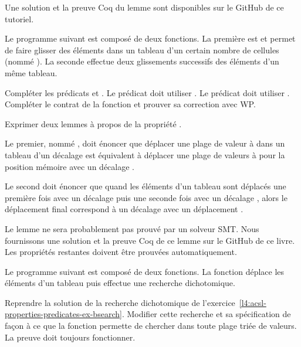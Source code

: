 Une solution et la preuve Coq du lemme sont disponibles sur le GitHub de ce tutoriel.


\label{l4:acsl-properties-lemmas-shift-trans}


Le programme suivant est composé de deux fonctions. La première est
 et permet de faire glisser des éléments dans un tableau
d'un certain nombre de cellules (nommé ). La seconde effectue deux
glissements successifs des éléments d'un même tableau.





Compléter les prédicats  et .
Le prédicat  doit utiliser .
Le prédicat  doit utiliser .
Compléter le contrat de la fonction  et prouver
sa correction avec WP.


Exprimer deux lemmes à propos de la propriété .


Le premier, nommé , doit énoncer que déplacer une plage de
valeur  à  dans un tableau 
d'un décalage  est équivalent à déplacer une plage de valeurs
 à  pour la position mémoire 
avec un décalage .


Le second doit énoncer que quand les éléments d'un tableau sont déplacés une première
fois avec un décalage  puis une seconde fois avec un décalage
, alors le déplacement final correspond à un décalage avec un
déplacement .


Le lemme  ne sera probablement pas prouvé par un solveur SMT.
Nous fournissons une solution et la preuve Coq de ce lemme sur le GitHub de ce livre.
Les propriétés restantes doivent être prouvées automatiquement.




Le programme suivant est composé de deux fonctions. La fonction
 déplace les éléments d'un tableau puis effectue
une recherche dichotomique.




Reprendre la solution de la recherche dichotomique de
l'exercice~\ref{l4:acsl-properties-predicates-ex-bsearch}. Modifier cette
recherche et sa spécification de façon à ce que la fonction permette de
chercher dans toute plage triée de valeurs. La preuve doit toujours fonctionner.


